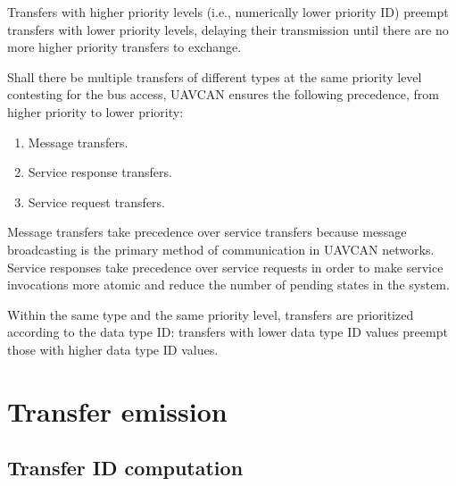 Transfers with higher priority levels (i.e., numerically lower priority ID)
preempt transfers with lower priority levels, delaying their transmission
until there are no more higher priority transfers to exchange.

Shall there be multiple transfers of different types at the same priority level contesting for the bus access,
UAVCAN ensures the following precedence, from higher priority to lower priority:

\begin{enumerate}
    \item Message transfers.
    \item Service response transfers.
    \item Service request transfers.
\end{enumerate}

Message transfers take precedence over service transfers because message broadcasting is the primary method of
communication in UAVCAN networks.
Service responses take precedence over service requests in order to make service invocations more atomic
and reduce the number of pending states in the system.

Within the same type and the same priority level,
transfers are prioritized according to the data type ID:
transfers with lower data type ID values preempt those with higher data type ID values.

\section{Transfer emission}

\subsection{Transfer ID computation}


